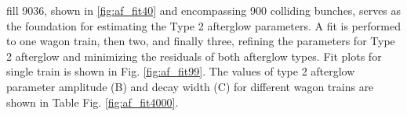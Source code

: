fill 9036, shown in \ref{fig:af_fit40} and encompassing 900 colliding bunches, serves as the foundation for estimating the Type 2 afterglow parameters. A fit is performed to one wagon train, then two, and finally three, refining the parameters for Type 2 afterglow and minimizing the residuals of both afterglow types. Fit plots for single train is shown in Fig. \ref{fig:af_fit99}. The values of type 2 afterglow parameter amplitude (B) and decay width (C) for different wagon trains are shown in Table Fig. \ref{fig:af_fit4000}. 

